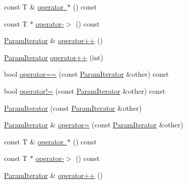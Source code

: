 \begin{DoxyCompactItemize}
\item 
const T \& \mbox{\hyperlink{classtesting_1_1internal_1_1_param_iterator_aa024380a4cc0cfdcaa114e942c348fce}{operator $\ast$}} () const
\item 
const T $\ast$ \mbox{\hyperlink{classtesting_1_1internal_1_1_param_iterator_aad035d35e8f0c1412854959a94d4887e}{operator-\/$>$}} () const
\item 
\mbox{\hyperlink{classtesting_1_1internal_1_1_param_iterator}{Param\+Iterator}} \& \mbox{\hyperlink{classtesting_1_1internal_1_1_param_iterator_ab0922f2f554fb3beaf13c442da605e8d}{operator++}} ()
\item 
\mbox{\hyperlink{classtesting_1_1internal_1_1_param_iterator}{Param\+Iterator}} \mbox{\hyperlink{classtesting_1_1internal_1_1_param_iterator_af51e17827dd54977165937550c0fb030}{operator++}} (int)
\item 
bool \mbox{\hyperlink{classtesting_1_1internal_1_1_param_iterator_adc356b4789eb0c2a1b5b033c7874e5a6}{operator==}} (const \mbox{\hyperlink{classtesting_1_1internal_1_1_param_iterator}{Param\+Iterator}} \&other) const
\item 
bool \mbox{\hyperlink{classtesting_1_1internal_1_1_param_iterator_a7a6aee04e8e44b5c8294929951cfac2b}{operator!=}} (const \mbox{\hyperlink{classtesting_1_1internal_1_1_param_iterator}{Param\+Iterator}} \&other) const
\item 
\mbox{\hyperlink{classtesting_1_1internal_1_1_param_iterator_aa10585055ee055e304703a3004f24f33}{Param\+Iterator}} (const \mbox{\hyperlink{classtesting_1_1internal_1_1_param_iterator}{Param\+Iterator}} \&other)
\item 
\mbox{\hyperlink{classtesting_1_1internal_1_1_param_iterator}{Param\+Iterator}} \& \mbox{\hyperlink{classtesting_1_1internal_1_1_param_iterator_a8019f54ea1c66ca39ffdec47acfabfe6}{operator=}} (const \mbox{\hyperlink{classtesting_1_1internal_1_1_param_iterator}{Param\+Iterator}} \&other)
\item 
const T \& \mbox{\hyperlink{classtesting_1_1internal_1_1_param_iterator_aa024380a4cc0cfdcaa114e942c348fce}{operator $\ast$}} () const
\item 
const T $\ast$ \mbox{\hyperlink{classtesting_1_1internal_1_1_param_iterator_aad035d35e8f0c1412854959a94d4887e}{operator-\/$>$}} () const
\item 
\mbox{\hyperlink{classtesting_1_1internal_1_1_param_iterator}{Param\+Iterator}} \& \mbox{\hyperlink{classtesting_1_1internal_1_1_param_iterator_ab0922f2f554fb3beaf13c442da605e8d}{operator++}} ()
\item 

\end{DoxyCompactItemize}
